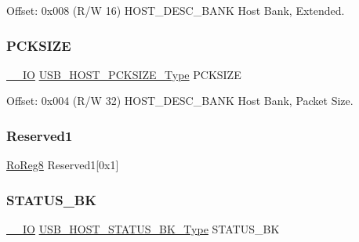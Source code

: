 Offset\+: 0x008 (R/W 16) H\+O\+S\+T\+\_\+\+D\+E\+S\+C\+\_\+\+B\+A\+NK Host Bank, Extended. 

\mbox{\label{struct_usb_host_desc_bank_a76a4477b8593fe7dec55b33ad17d3a72}} 
\subsubsection{\texorpdfstring{PCKSIZE}{PCKSIZE}}
{\footnotesize\ttfamily \mbox{\hyperlink{core__cm0plus_8h_aec43007d9998a0a0e01faede4133d6be}{\+\_\+\+\_\+\+IO}} \mbox{\hyperlink{union_u_s_b___h_o_s_t___p_c_k_s_i_z_e___type}{U\+S\+B\+\_\+\+H\+O\+S\+T\+\_\+\+P\+C\+K\+S\+I\+Z\+E\+\_\+\+Type}} P\+C\+K\+S\+I\+ZE}



Offset\+: 0x004 (R/W 32) H\+O\+S\+T\+\_\+\+D\+E\+S\+C\+\_\+\+B\+A\+NK Host Bank, Packet Size. 

\mbox{\label{struct_usb_host_desc_bank_a092866123ac46d0985136e4dca2f36f4}} 
\subsubsection{\texorpdfstring{Reserved1}{Reserved1}}
{\footnotesize\ttfamily \mbox{\hyperlink{group___s_a_m_d21_e15_a__definitions_ga0d957f1433aaf5d70e4dc2b68288442d}{Ro\+Reg8}} Reserved1\mbox{[}0x1\mbox{]}}

\mbox{\label{struct_usb_host_desc_bank_a0798901e51bb9674eee7a6d22876f75e}} 
\subsubsection{\texorpdfstring{STATUS\_BK}{STATUS\_BK}}
{\footnotesize\ttfamily \mbox{\hyperlink{core__cm0plus_8h_aec43007d9998a0a0e01faede4133d6be}{\+\_\+\+\_\+\+IO}} \mbox{\hyperlink{union_u_s_b___h_o_s_t___s_t_a_t_u_s___b_k___type}{U\+S\+B\+\_\+\+H\+O\+S\+T\+\_\+\+S\+T\+A\+T\+U\+S\+\_\+\+B\+K\+\_\+\+Type}} S\+T\+A\+T\+U\+S\+\_\+\+BK}



